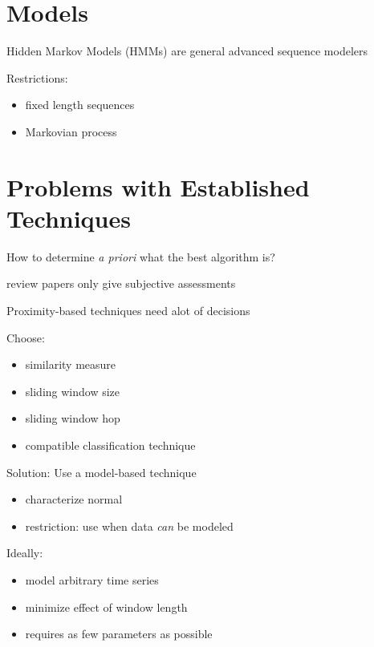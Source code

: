 \documentclass{beamer}
\begin{document}
  \section{Models}

  \begin{frame}{Hidden Markov Models (HMMs) are general advanced sequence modelers}
    
    Restrictions:
    \begin{itemize}
      \item fixed length sequences
      \item Markovian process
    \end{itemize}

  \end{frame}


  \section{Problems with Established Techniques}


  \begin{frame}{How to determine \emph{a priori} what the best algorithm is?}
    
    review papers only give subjective assessments

  \end{frame}


  \begin{frame}{Proximity-based techniques need alot of decisions}
    
    Choose:
    \begin{itemize}
      \item similarity measure
      \item sliding window size
      \item sliding window hop
      \item compatible classification technique
    \end{itemize}

  \end{frame}


  \begin{frame}{Solution: Use a model-based technique}
    
    \begin{itemize}
      \item characterize normal %
      \item restriction: use when data \emph{can} be modeled
    \end{itemize}

    Ideally:
    \begin{itemize}
      \item model arbitrary time series
      \item minimize effect of window length
      \item requires as few parameters as possible
    \end{itemize}

  \end{frame}
\end{document}

